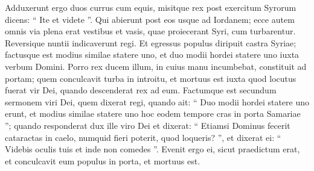 \begin{biblechapter}
\begin{biblechapter}
\begin{biblechapter}
\begin{biblechapter}
\begin{biblechapter}
\begin{biblechapter}
\begin{biblechapter}
\verse Adduxerunt ergo duos currus cum equis, misitque rex post exercitum Syrorum dicens: “ Ite et videte ”. 
\verse Qui abierunt post eos usque ad Iordanem; ecce autem omnis via plena erat vestibus et vasis, quae proiecerant Syri, cum turbarentur. Reversique nuntii indicaverunt regi.
 \verse Et egressus populus diripuit castra Syriae; factusque est modius similae statere uno, et duo modii hordei statere uno iuxta verbum Domini.
 \verse Porro rex ducem illum, in cuius manu incumbebat, constituit ad portam; quem conculcavit turba in introitu, et mortuus est iuxta quod locutus fuerat vir Dei, quando descenderat rex ad eum. 
\verse Factumque est secundum sermonem viri Dei, quem dixerat regi, quando ait: “ Duo modii hordei statere uno erunt, et modius similae statere uno hoc eodem tempore cras in porta Samariae ”; 
\verse quando responderat dux ille viro Dei et dixerat: “ Etiamsi Dominus fecerit cataractas in caelo, numquid fieri poterit, quod loqueris? ”, et dixerat ei: “ Videbis oculis tuis et inde non comedes ”. 
\verse Evenit ergo ei, sicut praedictum erat, et conculcavit eum populus in porta, et mortuus est.
 

\end{biblechapter}
\end{biblechapter}
\end{biblechapter}
\end{biblechapter}
\end{biblechapter}
\end{biblechapter}
\end{biblechapter}
